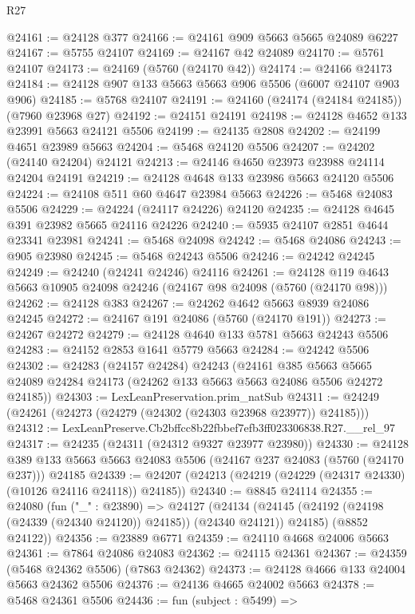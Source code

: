 \begin{lexlean}{R27}
\begin{coremodule}
@24161 := @24128 @377
@24166 := @24161 @909 @5663 @5665 @24089 @6227
@24167 := @5755 @24107
@24169 := @24167 @42 @24089
@24170 := @5761 @24107
@24173 := @24169 (@5760 (@24170 @42))
@24174 := @24166 @24173
@24184 := @24128 @907 @133 @5663 @5663 @906 @5506 (@6007 @24107 @903 @906)
@24185 := @5768 @24107
@24191 := @24160 (@24174 (@24184 @24185)) (@7960 @23968 @27)
@24192 := @24151 @24191
@24198 := @24128 @4652 @133 @23991 @5663 @24121 @5506
@24199 := @24135 @2808
@24202 := @24199 @4651 @23989 @5663
@24204 := @5468 @24120 @5506
@24207 := @24202 (@24140 @24204) @24121
@24213 := @24146 @4650 @23973 @23988 @24114 @24204 @24191
@24219 := @24128 @4648 @133 @23986 @5663 @24120 @5506
@24224 := @24108 @511 @60 @4647 @23984 @5663
@24226 := @5468 @24083 @5506
@24229 := @24224 (@24117 @24226) @24120
@24235 := @24128 @4645 @391 @23982 @5665 @24116 @24226
@24240 := @5935 @24107 @2851 @4644 @23341 @23981
@24241 := @5468 @24098
@24242 := @5468 @24086
@24243 := @905 @23980
@24245 := @5468 @24243 @5506
@24246 := @24242 @24245
@24249 := @24240 (@24241 @24246) @24116
@24261 := @24128 @119 @4643 @5663 @10905 @24098 @24246 (@24167 @98 @24098 (@5760 (@24170 @98)))
@24262 := @24128 @383
@24267 := @24262 @4642 @5663 @8939 @24086 @24245
@24272 := @24167 @191 @24086 (@5760 (@24170 @191))
@24273 := @24267 @24272
@24279 := @24128 @4640 @133 @5781 @5663 @24243 @5506
@24283 := @24152 @2853 @1641 @5779 @5663
@24284 := @24242 @5506
@24302 := @24283
    (@24157 @24284)
    @24243
    (@24161
      @385
      @5663
      @5665
      @24089
      @24284
      @24173
      (@24262 @133 @5663 @5663 @24086 @5506 @24272 @24185))
@24303 := LexLeanPreservation.prim_natSub
@24311 := @24249 (@24261 (@24273 (@24279 (@24302 (@24303 @23968 @23977)) @24185)))
@24312 := LexLeanPreserve.Cb2bffcc8b22fbbef7efb3ff023306838.R27.__rel_97
@24317 := @24235 (@24311 (@24312 @9327 @23977 @23980))
@24330 := @24128
    @389
    @133
    @5663
    @5663
    @24083
    @5506
    (@24167 @237 @24083 (@5760 (@24170 @237)))
    @24185
@24339 := @24207 (@24213 (@24219 (@24229 (@24317 @24330) (@10126 @24116 @24118)) @24185))
@24340 := @8845 @24114
@24355 := @24080
    (fun ("_" : @23890) =>
    @24127
      (@24134 (@24145 (@24192 (@24198 (@24339 (@24340 @24120)) @24185)) (@24340 @24121)) @24185)
      (@8852 @24122))
@24356 := @23889 @6771
@24359 := @24110 @4668 @24006 @5663
@24361 := @7864 @24086 @24083
@24362 := @24115 @24361
@24367 := @24359 (@5468 @24362 @5506) (@7863 @24362)
@24373 := @24128 @4666 @133 @24004 @5663 @24362 @5506
@24376 := @24136 @4665 @24002 @5663
@24378 := @5468 @24361 @5506
@24436 := fun (subject : @5499) =>

\end{coremodule}
\end{lexlean}
